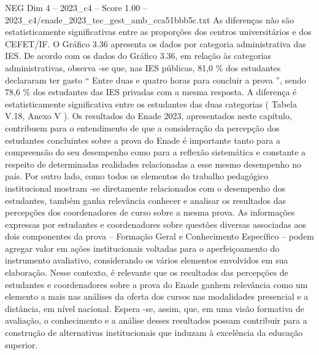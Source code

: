 \begin{textsample}{NEG Dim 4 – 2023\_c4 – Score 1.00 – 2023\_c4/enade\_2023\_tec\_gest\_amb\_cca51bbb5c.txt}
As diferenças não são estatisticamente significativas entre as proporções dos centros universitários e dos CEFET/IF.
O Gráfico 3.36 apresenta os dados por categoria administrativa das IES.
De acordo com os dados do Gráfico 3.36, em relação às categorias administrativas, observa -se que, nas IES públicas, 81,0 \% dos estudantes declararam ter gasto “ Entre duas e quatro horas para concluir a prova ”, sendo 78,6 \% dos estudantes das IES privadas com a mesma resposta.
A diferença é estatisticamente significativa entre os estudantes das duas categorias ( Tabela V.18, Anexo V ).
Os resultados do Enade 2023, apresentados neste capítulo, contribuem para o entendimento de que a consideração da percepção dos estudantes concluintes sobre a prova do Enade é importante tanto para a compreensão do seu desempenho como para a reflexão sistemática e constante a respeito de determinadas realidades relacionadas a esse mesmo desempenho no país.
Por outro lado, como todos os elementos do trabalho pedagógico institucional mostram -se diretamente relacionados com o desempenho dos estudantes, também ganha relevância conhecer e analisar os resultados das percepções dos coordenadores de curso sobre a mesma prova.
As informações expressas por estudantes e coordenadores sobre questões diversas associadas aos dois componentes da prova – Formação Geral e Conhecimento Específico – podem agregar valor em ações institucionais voltadas para o aperfeiçoamento do instrumento avaliativo, considerando os vários elementos envolvidos em sua elaboração.
Nesse contexto, é relevante que os resultados das percepções de estudantes e coordenadores sobre a prova do Enade ganhem relevância como um elemento a mais nas análises da oferta dos cursos nas modalidades presencial e a distância, em nível nacional.
Espera -se, assim, que, em uma visão formativa de avaliação, o conhecimento e a análise desses resultados possam contribuir para a construção de alternativas institucionais que induzam à excelência da educação superior.

\end{textsample}
